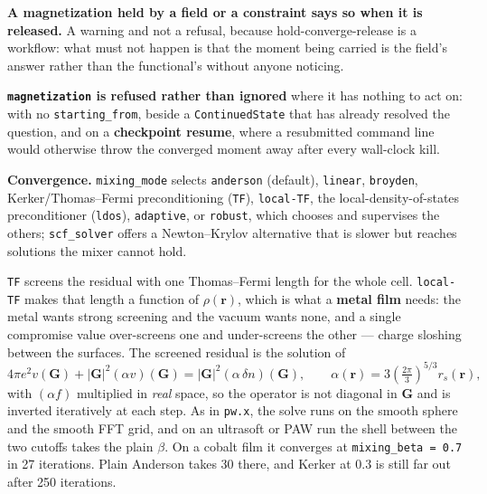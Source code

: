 \documentclass[11pt,a4paper]{article}
\newcommand{\code}[1]{\texttt{\small #1}}
\begin{document}
\begin{refuses}
\textbf{A magnetization held by a field or a constraint says so when it is
released.} A warning and not a refusal, because hold-converge-release is a
workflow: what must not happen is that the moment being carried is the field's
answer rather than the functional's without anyone noticing.

\textbf{\code{magnetization} is refused rather than ignored} where it has
nothing to act on: with no \code{starting\_from}, beside a
\code{ContinuedState} that has already resolved the question, and on a
\textbf{checkpoint resume}, where a resubmitted command line would otherwise
throw the converged moment away after every wall-clock kill.
\end{refuses}

\textbf{Convergence.} \code{mixing\_mode} selects \code{anderson} (default),
\code{linear}, \code{broyden}, Kerker/Thomas--Fermi preconditioning (\code{TF}),
\code{local-TF}, the local-density-of-states preconditioner (\code{ldos}),
\code{adaptive}, or \code{robust}, which chooses and supervises the others;
\code{scf\_solver} offers a Newton--Krylov
alternative that is slower but reaches solutions the mixer cannot hold.

\code{TF} screens the residual with one Thomas--Fermi length for the whole cell.
\code{local-TF} makes that length a function of $\rho(\mathbf r)$, which is what
a \textbf{metal film} needs: the metal wants strong screening and the vacuum wants
none, and a single compromise value over-screens one and under-screens the other
--- charge sloshing between the surfaces. The screened residual is the solution
of
\begin{equation*}
  4\pi e^2 v(\mathbf G) + |\mathbf G|^2 (\alpha v)(\mathbf G)
    = |\mathbf G|^2 (\alpha\,\delta n)(\mathbf G),
  \qquad \alpha(\mathbf r) = 3\left(\tfrac{2\pi}{3}\right)^{5/3} r_s(\mathbf r),
\end{equation*}
with $(\alpha f)$ multiplied in \emph{real} space, so the operator is not
diagonal in $\mathbf G$ and is inverted iteratively at each step. As in
\code{pw.x}, the solve runs on the smooth sphere and the smooth FFT grid, and on an
ultrasoft or PAW run the shell between the two cutoffs takes the plain $\beta$. On a cobalt
film it converges at \code{mixing\_beta = 0.7} in 27 iterations. Plain Anderson
takes 30 there, and Kerker at $0.3$ is still far out after 250 iterations.
\end{document}
